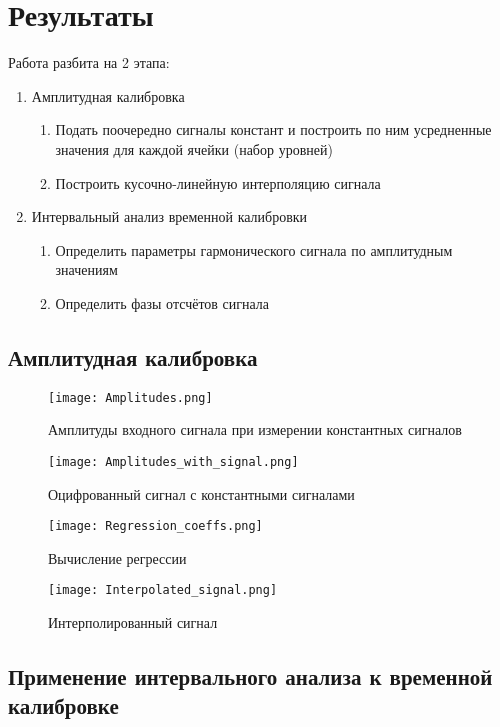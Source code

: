 \documentclass[12pt,a4paper]{article}
\begin{document}
\section{Результаты}
Работа разбита на 2 этапа:
\begin{enumerate}
    \item Амплитудная калибровка
    \begin{enumerate}
        \item Подать поочередно сигналы констант и построить по ним усредненные значения для каждой ячейки (набор уровней)
        \item Построить кусочно-линейную интерполяцию сигнала
    \end{enumerate}
    \item Интервальный анализ временной калибровки
    \begin{enumerate}
        \item Определить параметры гармонического сигнала по амплитудным значениям
        \item Определить фазы отсчётов сигнала
    \end{enumerate}
\end{enumerate}

\subsection{Амплитудная калибровка}

\begin{figure}[H]
    \centering
    \texttt{[image: Amplitudes.png]}
    \caption{Амплитуды входного сигнала при измерении константных сигналов}
\end{figure}

\begin{figure}[H]
    \centering
    \texttt{[image: Amplitudes\_with\_signal.png]}
    \caption{Оцифрованный сигнал с константными сигналами}
\end{figure}

\begin{figure}[H]
    \centering
    \texttt{[image: Regression\_coeffs.png]}
    \caption{Вычисление регрессии}
\end{figure}

\begin{figure}[H]
    \centering
    \texttt{[image: Interpolated\_signal.png]}
    \caption{Интерполированный сигнал}
\end{figure}

\subsection{Применение интервального анализа к временной калибровке}
\end{document}
